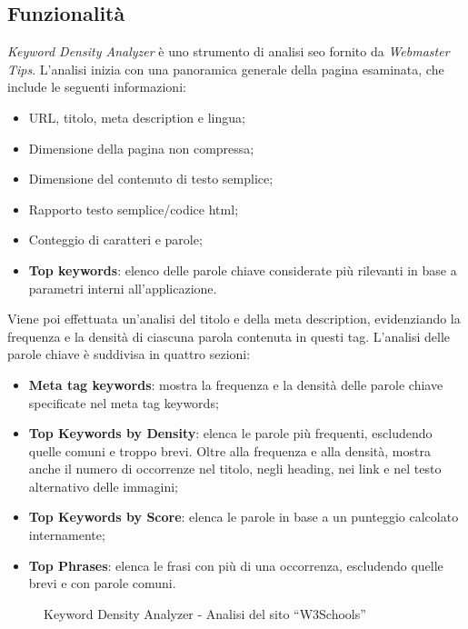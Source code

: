 \subsection{Funzionalità}
\par \textit{Keyword Density Analyzer} è uno strumento di analisi \gls{seo} fornito da \textit{Webmaster Tips}. L'analisi inizia con una panoramica generale della pagina esaminata, che include le seguenti informazioni:
\begin{itemize}
    \item URL, titolo, meta description e lingua;
    \item Dimensione della pagina non compressa;
    \item Dimensione del contenuto di testo semplice;
    \item Rapporto testo semplice/codice \gls{html};
    \item Conteggio di caratteri e parole;
    \item \textbf{Top keywords}: elenco delle parole chiave considerate più rilevanti in base a parametri interni all'applicazione.
\end{itemize}
\vspace{5pt}
\par\noindent Viene poi effettuata un'analisi del titolo e della meta description, evidenziando la frequenza e la densità di ciascuna parola contenuta in questi tag. L'analisi delle parole chiave è suddivisa in quattro sezioni:
\begin{itemize}
    \item \textbf{Meta tag keywords}: mostra la frequenza e la densità delle parole chiave specificate nel meta tag keywords;
    \item \textbf{Top Keywords by Density}: elenca le parole più frequenti, escludendo quelle comuni e troppo brevi. Oltre alla frequenza e alla densità, mostra anche il numero di occorrenze nel titolo, negli heading, nei link e nel testo alternativo delle immagini;
    \item \textbf{Top Keywords by Score}: elenca le parole in base a un punteggio calcolato internamente;
    \item \textbf{Top Phrases}: elenca le frasi con più di una occorrenza, escludendo quelle brevi e con parole comuni.
\end{itemize}

\begin{figure}[H]
    \centering 
    \caption{Keyword Density Analyzer - Analisi del sito “W3Schools”}
\end{figure}

